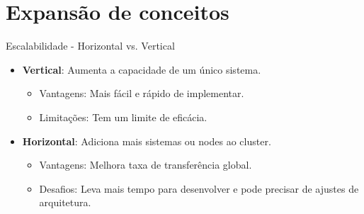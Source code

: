 \documentclass{beamer}
\begin{document}
\section{Expansão de conceitos}

\begin{frame}{Escalabilidade - Horizontal vs. Vertical}
	\begin{itemize}
		\item \textbf{Vertical}: Aumenta a capacidade de um único sistema.
		      \begin{itemize}
			      \item Vantagens: Mais fácil e rápido de implementar.
			      \item Limitações: Tem um limite de eficácia.
		      \end{itemize}

		\item \textbf{Horizontal}: Adiciona mais sistemas ou nodes ao cluster.
		      \begin{itemize}
			      \item Vantagens: Melhora taxa de transferência global.
			      \item Desafios: Leva mais tempo para desenvolver e pode precisar de ajustes de arquitetura.
		      \end{itemize}
	\end{itemize}
\end{frame}
\end{document}
